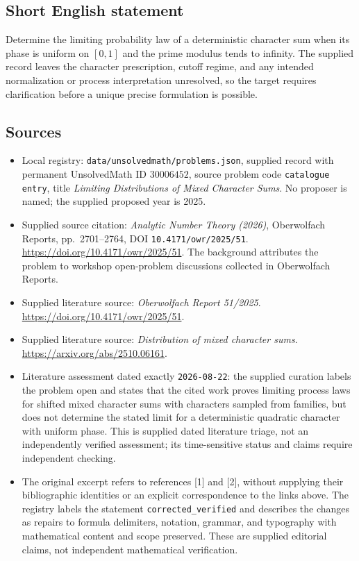 \documentclass[11pt]{article}
\begin{document}
\subsection{Short English statement}
Determine the limiting probability law of a deterministic character sum when its phase is uniform on \([0,1]\) and the prime modulus tends to infinity. The supplied record leaves the character prescription, cutoff regime, and any intended normalization or process interpretation unresolved, so the target requires clarification before a unique precise formulation is possible.
\subsection{Sources}
\begin{itemize}
\item Local registry: \texttt{data/unsolvedmath/problems.json}, supplied record with permanent UnsolvedMath ID \(30006452\), source problem code \texttt{catalogue entry}, title \emph{Limiting Distributions of Mixed Character Sums}. No proposer is named; the supplied proposed year is 2025.
\item Supplied source citation: \emph{Analytic Number Theory (2026)}, Oberwolfach Reports, pp.\ 2701--2764, DOI \texttt{10.4171/owr/2025/51}. \url{https://doi.org/10.4171/owr/2025/51}. The background attributes the problem to workshop open-problem discussions collected in Oberwolfach Reports.
\item Supplied literature source: \emph{Oberwolfach Report 51/2025}. \url{https://doi.org/10.4171/owr/2025/51}.
\item Supplied literature source: \emph{Distribution of mixed character sums}. \url{https://arxiv.org/abs/2510.06161}.
\item Literature assessment dated exactly \texttt{2026-08-22}: the supplied curation labels the problem open and states that the cited work proves limiting process laws for shifted mixed character sums with characters sampled from families, but does not determine the stated limit for a deterministic quadratic character with uniform phase. This is supplied dated literature triage, not an independently verified assessment; its time-sensitive status and claims require independent checking.
\item The original excerpt refers to references [1] and [2], without supplying their bibliographic identities or an explicit correspondence to the links above. The registry labels the statement \texttt{corrected\_verified} and describes the changes as repairs to formula delimiters, notation, grammar, and typography with mathematical content and scope preserved. These are supplied editorial claims, not independent mathematical verification.
\end{itemize}
\end{document}
